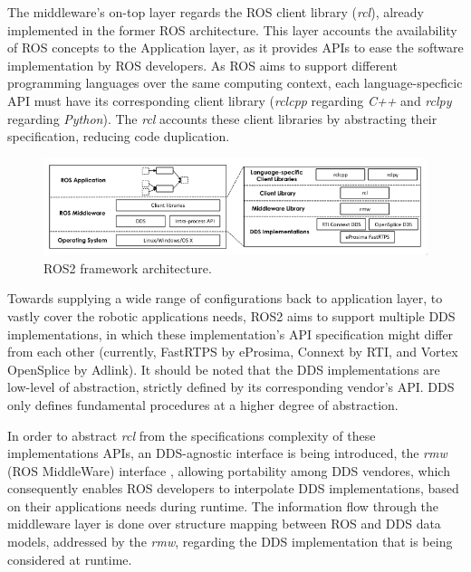The middleware's on-top layer regards the ROS client library (\textit{rcl}), already implemented in the former ROS architecture. This layer accounts the availability of ROS concepts to the Application layer, as it provides APIs to ease the software implementation by ROS developers. \cite{ros2documentation} As ROS aims to support different programming languages over the same computing context, each language-specficic API must have its corresponding client library (\textit{rclcpp} regarding \textit{C++} and \textit{rclpy} regarding \textit{Python}). The \textit{rcl} accounts these client libraries by abstracting their specification, reducing code duplication.   
\cite{rcl, casini2019response}


\begin{figure}[H]
    \centering
    \includegraphics[width=\linewidth]{images/ros2-architecture.png}
    \caption{ROS2 framework architecture.}
    \label{fig:ros2-architecture}
\end{figure}

Towards supplying a wide range of configurations back to application layer, to vastly cover the robotic applications needs, ROS2 aims to support multiple DDS implementations, in which these implementation's API specification might differ from each other (currently, FastRTPS by eProsima, Connext by RTI, and Vortex OpenSplice by Adlink). It should be noted that the DDS implementations are low-level of abstraction, strictly defined by its corresponding vendor's API. DDS only defines fundamental procedures at a higher degree of abstraction.  

In order to abstract \textit{rcl} from the specifications complexity of these implementations APIs, an DDS-agnostic interface is being introduced, the \textit{rmw} (ROS MiddleWare) interface \cite{casini2019response}, allowing portability among DDS vendores, which consequently enables ROS developers to interpolate DDS implementations, based on their applications needs during runtime. The information flow through the middleware layer is done over structure mapping between ROS and DDS data models, addressed by the \textit{rmw}, regarding the DDS implementation that is being considered at runtime.


